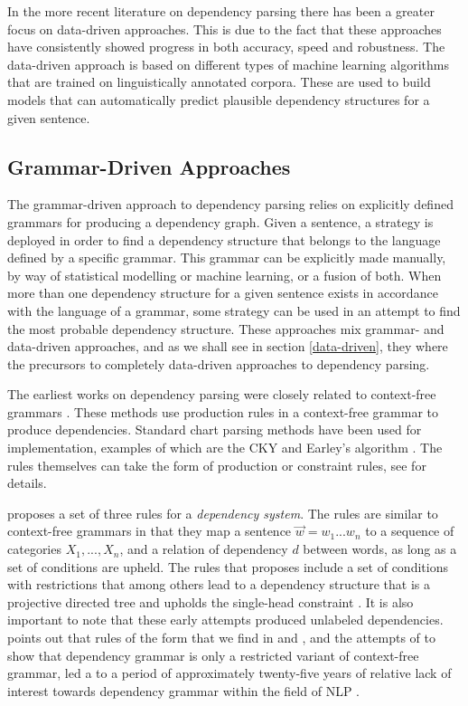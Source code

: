 In the more recent literature on dependency parsing there has been a greater focus on data-driven approaches. This is due to the fact that these approaches have consistently showed progress in both accuracy, speed and robustness. The data-driven approach is based on different types of machine learning algorithms that are trained on linguistically annotated corpora. These are used to build models that can automatically predict plausible dependency structures for a given sentence.

\subsection{Grammar-Driven Approaches}
\label{grammar-driven}

The grammar-driven approach to dependency parsing relies on explicitly defined grammars for producing a dependency graph. Given a sentence, a strategy is deployed in order to find a dependency structure that belongs to the language defined by a specific grammar. This grammar can be explicitly made manually, by way of statistical modelling or machine learning, or a fusion of both. When more than one dependency structure for a given sentence exists in accordance with the language of a grammar, some strategy can be used in an attempt to find the most probable dependency structure. These approaches mix grammar- and data-driven approaches, and as we shall see in section \ref{data-driven}, they where the precursors to completely data-driven approaches to dependency parsing.

The earliest works on dependency parsing were closely related to context-free grammars \cite{KublerEtAl:09}. These methods use production rules in a context-free grammar to produce dependencies. Standard chart parsing methods have been used for implementation, examples of which are the CKY \cite{Younger:67} and Earley's algorithm \cite{Early:70}. The rules themselves can take the form of production or constraint rules, see  for details.

\citeauthor{Gaifman:65} proposes a set of three rules for a \textit{dependency system}. The rules are similar to context-free grammars in that they map a sentence $\vec{w} = w_1 ... w_n$ to a sequence of categories $X_1, ..., X_n$, and a relation of dependency $d$ between words, as long as a set of conditions are upheld. The rules that \citeauthor{Gaifman:65} proposes include a set of conditions with restrictions that among others lead to a dependency structure that is a projective directed tree and upholds the single-head constraint \cite{Gaifman:65}. It is also important to note that these early attempts produced unlabeled dependencies. \citeauthor{Niv:05} points out that rules of the form that we find in  and , and the attempts of \citeauthor{Gaifman:65} to show that dependency grammar is only a restricted variant of context-free grammar, led a to a period of approximately twenty-five years of relative lack of interest towards dependency grammar within the field of NLP \cite{Niv:05}. 

